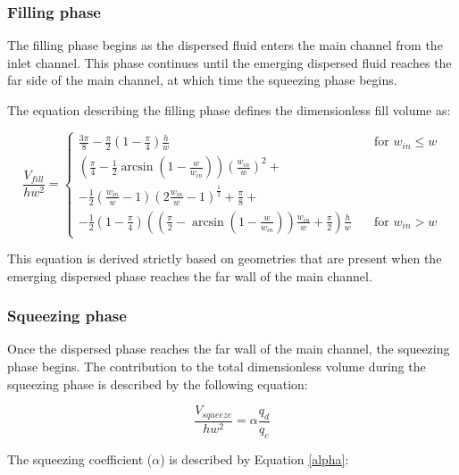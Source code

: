 \subsubsection{Filling phase}

The filling phase begins as the dispersed fluid enters the main
channel from the inlet channel. This phase continues until the emerging
dispersed fluid reaches the far side of the main channel, at which time
the squeezing phase begins.

The equation describing the filling phase defines the dimensionless fill volume as:

\begin{equation}
  \frac{V_{fill}}{hw^{2}} = 
    \begin{cases}
      \frac{3\pi}{8} - \frac{\pi}{2} \left(1 - \frac{\pi}{4}\right) \frac{h}{w} & \quad \text{for } w_{in} \leq w\\
      \left(\frac{\pi}{4} - \frac{1}{2} \arcsin\left(1-\frac{w}{w_{in}}\right)\right) \left(\frac{w_{in}}{w}\right)^2 + \\
      -\frac{1}{2} \left(\frac{w_{in}}{w} - 1\right) \left(2\frac{w_{in}}{w} - 1\right)^\frac{1}{2} +
      \frac{\pi}{8} + \\
      -\frac{1}{2} \left(1 - \frac{\pi}{4}\right) \left(\left(\frac{\pi}{2} - \arcsin\left(1 - \frac{w}{w_{in}}\right)\right)\frac{w_{in}}{w} + \frac{\pi}{2}\right)\frac{h}{w}
      & \quad \text{for } w_{in} > w
    \end{cases}\label{nondim_fill_vol}
\end{equation}

\noindent This equation is derived strictly based on geometries that are present when the
emerging dispersed phase reaches the far wall of the main channel.

\subsubsection{Squeezing phase}

Once the dispersed phase reaches the far wall of the main channel, the squeezing
phase begins. The contribution to the total dimensionless volume during the
squeezing phase is described by the following equation:

\begin{equation}
  \frac{V_{squeeze}}{hw^2} = {\alpha}\frac{q_d}{q_c}\label{nondim_squeeze_vol}
\end{equation}

\noindent The squeezing coefficient ($\alpha$) is described by Equation \eqref{alpha}:

